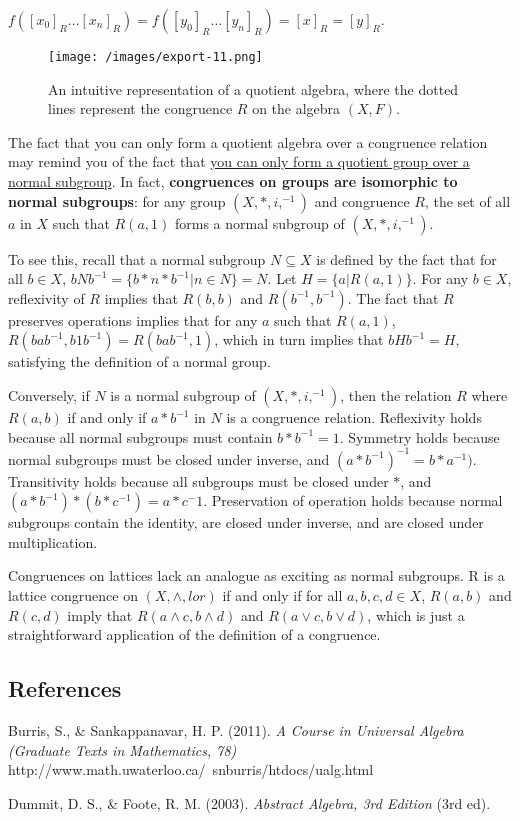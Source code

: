 \documentclass{article}
\begin{document}
$f([x_0]_R \dots [x_n]_R) = f([y_0]_R \dots [y_n]_R)  = [x]_R = [y]_R.$
\begin{figure}
    \texttt{[image: /images/export-11.png]}
\caption{An intuitive representation of a quotient algebra, where the dotted lines represent the congruence $R$ on the algebra $(X, F)$. }
\end{figure}

The fact that you can only form a quotient algebra over a congruence relation may remind you of the fact that \href{https://mathworld.wolfram.com/QuotientGroup.html}{you can only form a quotient group over a normal subgroup}. In fact, \textbf{congruences on groups are isomorphic to normal subgroups}: for any group $(X, \ast, i, ^{-1})$ and congruence $R$, the set of all $a$ in $X$ such that $R(a, 1)$ forms a normal subgroup of $(X, \ast, i, ^{-1})$. 

To see this, recall that a normal subgroup $N \subseteq X$ is defined by the fact that for all $b \in X$, $b N b^{-1} = \{b \ast n \ast b^{-1} | n \in N\} = N$. Let $H = \{a | R(a, 1)\}$. For any $b \in X$, reflexivity of $R$ implies that $R(b, b)$ and $R(b^{-1}, b^{-1})$. The fact that $R$ preserves operations implies that for any $a$ such that $R(a, 1)$, $R(bab^{-1}, b1b^{-1}) = R(bab^{-1}, 1)$, which in turn implies that $bHb^{-1} = H$, satisfying the definition of a normal group.

Conversely, if $N$ is a normal subgroup of $(X, \ast, i, ^{-1})$, then the relation $R$ where $R(a, b)$ if and only if $a \ast b^{-1}$ in $N$ is a congruence relation. Reflexivity holds because all normal subgroups must contain $b \ast b^{-1} = 1$. Symmetry holds because normal subgroups must be closed under inverse, and $(a \ast b^{-1})^{-1} = b \ast a ^{-1})$. Transitivity holds because all subgroups must be closed under $\ast$, and $( a \ast b^{-1}) \ast (b \ast c^{-1}) = a \ast c^-1.$ Preservation of operation holds because normal subgroups contain the identity, are closed under inverse, and are closed under multiplication.

Congruences on lattices lack an analogue as exciting as normal subgroups. R is a lattice congruence on $(X, \land, lor)$ if and only if for all $a, b, c, d \in X$, $R(a, b)$ and $R(c, d)$ imply that $R(a \land c, b \land d)$ and $R(a \lor c, b \lor d)$, which is just a straightforward application of the definition of a congruence.

\subsection{References}

Burris, S., & Sankappanavar, H. P. (2011). \textit{A Course in Universal Algebra (Graduate Texts in Mathematics, 78)} http://www.math.uwaterloo.ca/~snburris/htdocs/ualg.html

Dummit, D. S., & Foote, R. M. (2003). \textit{Abstract Algebra, 3rd Edition} (3rd ed).
\end{document}
